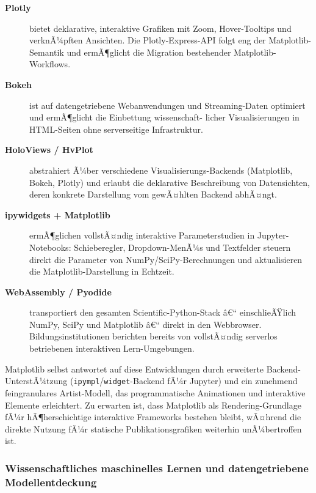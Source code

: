 \documentclass[12pt, a4paper]{article}
\begin{document}
\begin{description}
  \item[\textbf{Plotly}] bietet deklarative, interaktive Grafiken mit
    Zoom, Hover-Tooltips und verknÃ¼pften Ansichten. Die Plotly-Express-API
    folgt eng der Matplotlib-Semantik und ermÃ¶glicht die Migration
    bestehender Matplotlib-Workflows.

  \item[\textbf{Bokeh}] ist auf datengetriebene Webanwendungen und
    Streaming-Daten optimiert und ermÃ¶glicht die Einbettung wissenschaft-
    licher Visualisierungen in HTML-Seiten ohne serverseitige Infrastruktur.

  \item[\textbf{HoloViews / HvPlot}] abstrahiert Ã¼ber verschiedene
    Visualisierungs-Backends (Matplotlib, Bokeh, Plotly) und erlaubt
    die deklarative Beschreibung von Datensichten, deren konkrete
    Darstellung vom gewÃ¤hlten Backend abhÃ¤ngt.

  \item[\textbf{ipywidgets + Matplotlib}] ermÃ¶glichen vollstÃ¤ndig
    interaktive Parameterstudien in Jupyter-Notebooks: Schieberegler,
    Dropdown-MenÃ¼s und Textfelder steuern direkt die Parameter von
    NumPy/SciPy-Berechnungen und aktualisieren die Matplotlib-Darstellung
    in Echtzeit.

  \item[\textbf{WebAssembly / Pyodide}] transportiert den gesamten
    Scientific-Python-Stack â€“ einschlieÃŸlich NumPy, SciPy und Matplotlib
    â€“ direkt in den Webbrowser. Bildungsinstitutionen berichten bereits
    von vollstÃ¤ndig serverlos betriebenen interaktiven Lern-Umgebungen.
\end{description}

Matplotlib selbst antwortet auf diese Entwicklungen durch erweiterte
Backend-UnterstÃ¼tzung (\texttt{ipympl}/\texttt{widget}-Backend fÃ¼r
Jupyter) und ein zunehmend feingranulares Artist-Modell, das programmatische
Animationen und interaktive Elemente erleichtert. Zu erwarten ist, dass
Matplotlib als Rendering-Grundlage fÃ¼r hÃ¶herschichtige interaktive
Frameworks bestehen bleibt, wÃ¤hrend die direkte Nutzung fÃ¼r statische
Publikationsgrafiken weiterhin unÃ¼bertroffen ist.

\subsubsection{Wissenschaftliches maschinelles Lernen und datengetriebene
Modellentdeckung}
\label{subsubsec:sciml}
\end{document}
